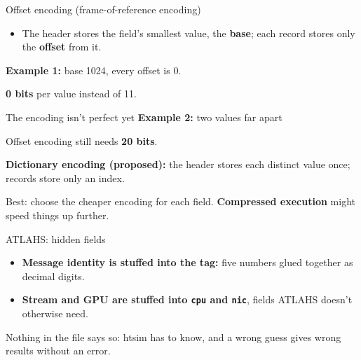 \documentclass[aspectratio=169,11pt]{beamer}
\newcommand{\diagram}[1]{\resizebox{\linewidth}{!}{}}
\newcommand{\encodingfig}[1]{\begingroup\def\encodingextra{#1}\endgroup}
\newcommand{\dictfig}{}
\newcommand{\vals}[1]{\foreach \v [count=\k] in {#1} \node[draw=black!65,fill=blue!8,minimum height=6mm,minimum width=14mm,font=\small,inner sep=2pt] at (\k*1.5,0) {\v};}
\newcommand{\thento}[1]{\par\vspace{1mm}\noindent\makebox[1.4em][l]{\color{gold!85!black}$\Rightarrow$}\parbox[t]{\dimexpr\linewidth-1.4em}{\raggedright #1}\par}
\begin{document}
\begin{frame}{Offset encoding (frame-of-reference encoding)}
\begin{itemize}
\item The header stores the field's smallest value, the \textbf{base}; each record stores only the \textbf{offset} from it.
\end{itemize}
\vspace{4mm}
\centering\encodingfig{}
\par\raggedright
\vspace{4mm}
\textbf{Example 1:} base 1024, every offset is 0.
\thento{\textbf{0 bits} per value instead of 11.}
\end{frame}

\begin{frame}{The encoding isn't perfect yet}
\textbf{Example 2:} two values far apart
\vspace{1mm}

\thento{Offset encoding still needs \textbf{20 bits}.}
\vspace{3mm}

\textbf{Dictionary encoding (proposed):} the header stores each distinct value once; records store only an index.
\vspace{1mm}

{\centering\resizebox{!}{0.26\textheight}{\dictfig}\par}
\vspace{1mm}
\thento{Best: choose the cheaper encoding for each field. \textbf{Compressed execution} might speed things up further.}
\end{frame}

\begin{frame}{ATLAHS: hidden fields}
\vspace{6mm}
\diagram{legacy-gpu-record}
\vspace{5mm}
\begin{itemize}
\item \textbf{Message identity is stuffed into the tag:} five numbers glued together as decimal digits.
\item \textbf{Stream and GPU are stuffed into \texttt{cpu} and \texttt{nic}}, fields ATLAHS doesn't otherwise need.
\end{itemize}
\thento{Nothing in the file says so: htsim has to know, and a wrong guess gives wrong results without an error.}
\end{frame}
\end{document}
